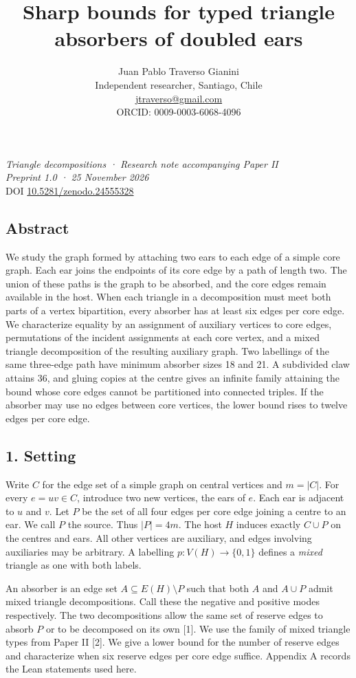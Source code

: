 \documentclass[english,11pt,a4paper]{article}
\title{Sharp bounds for typed triangle absorbers of doubled ears}
\author{Juan Pablo Traverso Gianini\\
\small Independent researcher, Santiago, Chile\\
\small \href{mailto:jtraverso@gmail.com}{jtraverso@gmail.com}\\
\small ORCID: 0009-0003-6068-4096}
\date{}
\begin{document}
\raggedbottom
\maketitle
\emph{Triangle decompositions · Research note accompanying Paper II}\\
\emph{Preprint 1.0 · 25 November 2026}\\
DOI \href{https://doi.org/10.5281/zenodo.24555328}{10.5281/zenodo.24555328}

\subsection{Abstract}\label{abstract}

We study the graph formed by attaching two ears to each edge of a simple core graph. Each ear joins the endpoints of its core edge by a path of length two. The union of these paths is the graph to be absorbed, and the core edges remain available in the host. When each triangle in a decomposition must meet both parts of a vertex bipartition, every absorber has at least six edges per core edge. We characterize equality by an assignment of auxiliary vertices to core edges, permutations of the incident assignments at each core vertex, and a mixed triangle decomposition of the resulting auxiliary graph. Two labellings of the same three-edge path have minimum absorber sizes 18 and 21. A subdivided claw attains 36, and gluing copies at the centre gives an infinite family attaining the bound whose core edges cannot be partitioned into connected triples. If the absorber may use no edges between core vertices, the lower bound rises to twelve edges per core edge.

\subsection{1. Setting}\label{setting}

Write \(C\) for the edge set of a simple graph on central vertices and \(m=|C|\). For every \(e=uv\in C\), introduce two new vertices, the ears of \(e\). Each ear is adjacent to \(u\) and \(v\). Let \(P\) be the set of all four edges per core edge joining a centre to an ear. We call \(P\) the source. Thus \(|P|=4m\). The host \(H\) induces exactly \(C\cup P\) on the centres and ears. All other vertices are auxiliary, and edges involving auxiliaries may be arbitrary. A labelling \(p\colon V(H)\to\{0,1\}\) defines a \emph{mixed} triangle as one with both labels.

An absorber is an edge set \(A\subseteq E(H)\setminus P\) such that both \(A\) and \(A\cup P\) admit mixed triangle decompositions. Call these the negative and positive modes respectively. The two decompositions allow the same set of reserve edges to absorb \(P\) or to be decomposed on its own {[}1{]}. We use the family of mixed triangle types from Paper II {[}2{]}. We give a lower bound for the number of reserve edges and characterize when six reserve edges per core edge suffice. Appendix A records the Lean statements used here.
\end{document}

